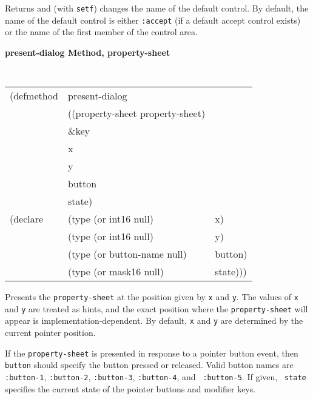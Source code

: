 \begin{flushright} \parbox[t]{6.125in}{Returns and (with {\tt setf}) changes
the name of the default control. 
By default, the name of the default control is either {\tt :accept} (if a
default accept control exists) or the name of the first member of the control
area.} \end{flushright}

{\samepage
{\large {\bf present-dialog \hfill Method, property-sheet}}
\begin{flushright} \parbox[t]{6.125in}{
\tt
\begin{tabular}{lll}
\raggedright
(defmethod & present-dialog & \\
           & ((property-sheet  property-sheet)\\
        & \&key \\
        & x \\
        & y\\
        & button\\
        & state)\\
(declare & (type (or int16 null)  & x)\\
         & (type (or int16 null)  & y)\\
        & (type (or button-name null) & button)\\ 
        & (type (or mask16 null)  & state)))\\ 
\end{tabular}
\rm

}\end{flushright}}



\begin{flushright} \parbox[t]{6.125in}{ Presents the {\tt property-sheet} at the
position given by {\tt x} and {\tt y}.  The values of {\tt x} and {\tt y} are
treated as hints, and the exact position where the {\tt property-sheet} will
appear is
implementation-dependent.  By default, {\tt x} and {\tt y} are determined by the
current pointer position.
 
If the {\tt property-sheet} is presented in response to a pointer button event, then
{\tt button} should specify the button pressed or released. Valid button names
are {\tt :button-1}, {\tt :button-2}, {\tt :button-3}, {\tt :button-4}, and {\tt
:button-5}. If given, {\tt
state} specifies the current state of the pointer buttons and modifier keys.

}\end{flushright}


